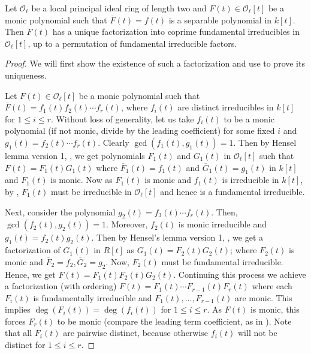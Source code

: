 \documentclass[10pt,a4paper]{amsart}
\begin{document}
\begin{lemma}\label{lem:tech-1-thm-1}
Let $\mathscr O_{\ell}$ be a local principal ideal ring of length two and $F(t) \in\mathscr O_\ell[t]$ be a monic polynomial such that $\overline{F}(t) = f(t)$ is a separable polynomial in $k[t]$. Then $F(t)$ has a unique factorization into coprime fundamental irreducibles in $\mathscr O_\ell[t]$, up to a permutation of fundamental irreducible factors.
\end{lemma}

\begin{proof}
We will first show the existence of such a factorization and use  to prove its uniqueness.

Let $F(t)\in \mathscr O_\ell[t]$ be a monic polynomial such that $\overline{F}(t) = f_1(t)f_2(t)\cdots f_r(t)$, where $f_i(t)$ are distinct irreducibles in $k[t]$ for $1\leq i\leq r$.
Without loss of generality, let us take $f_i(t)$ to be a monic polynomial (if not monic, divide by the leading coefficient) for some fixed $i$ and $g_1(t) = f_2(t)\cdots f_r(t)$.
Clearly $\gcd(f_1(t), g_1(t)) = 1$. 
Then by Hensel lemma version 1, , we get polynomials $F_1(t)$ and $G_1(t)$ in $\mathscr O_\ell[t]$ such that $F(t) = F_1(t)G_1(t)$ where $\overline{F}_1(t) =f_1(t)$ and $\overline{G}_1(t) =g_1(t)$ in $k[t]$ and $F_1(t)$ is monic.
Now as $F_1(t)$ is monic and $f_1(t)$ is irreducible in $k[t]$, by , $F_1(t)$ must be irreducible in $\mathscr O_\ell[t]$ and hence is a fundamental irreducible.

Next, consider the polynomial ${g}_2(t) = f_3(t)\cdots f_r(t).$ 
Then, $\gcd(f_2(t), {g}_2(t))=1$. Moreover, $f_2(t)$ is monic irreducible and $g_1(t) = f_2(t){g}_2(t)$. Then by Hensel's lemma version 1, , we get a factorization of $G_1(t)$ in $R[t]$ as $G_1(t) = F_2(t)G_2(t)$; where $F_2(t)$ is monic and $\overline{F}_2 =f_2, \overline{G}_2={g_2}$. 
Now, $F_2(t)$ must be fundamental irreducible. Hence, we get $F(t)=F_1(t) F_2(t) G_2(t)$. Continuing this process we achieve a factorization (with ordering) $F(t) =F_1(t)\cdots F_{r-1}(t)F_r(t)$ where each $F_i(t)$ is fundamentally irreducible and $F_1(t),\ldots, F_{r-1}(t)$ are monic. This implies $\deg(F_i(t)) = \deg(f_i(t))$ for $1\leq i\leq r$. As $F(t)$ is monic, this forces $F_r(t)$ to be monic (compare the leading term coefficient, as in ). Note that all $F_i(t)$ are pairwise distinct, because otherwise $f_i(t)$ will not be distinct for $1\leq i\leq r$.


\end{proof}
\end{document}
